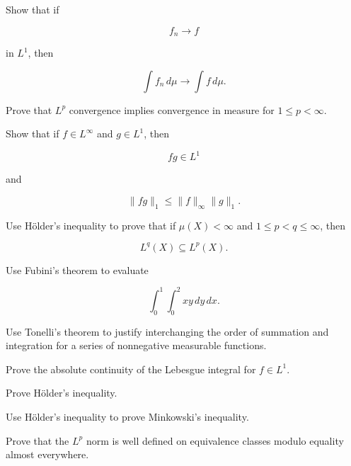 \begin{exercise}[3]
Show that if

\[
f_n\to f
\]

in \(L^1\), then

\[
\int f_n\,d\mu
\to
\int f\,d\mu.
\]
\end{exercise}

\begin{exercise}[3]
Prove that \(L^p\) convergence implies convergence in measure for
\(1\leq p<\infty\).
\end{exercise}

\begin{exercise}[3]
Show that if \(f\in L^\infty\) and \(g\in L^1\), then

\[
fg\in L^1
\]

and

\[
\boxed{
\|fg\|_1
\leq
\|f\|_\infty\|g\|_1.
}
\]
\end{exercise}

\begin{exercise}[3]
Use H\"older's inequality to prove that if \(\mu(X)<\infty\) and
\(1\leq p<q\leq\infty\), then

\[
L^q(X)\subseteq L^p(X).
\]
\end{exercise}

\begin{exercise}[3]
Use Fubini's theorem to evaluate

\[
\int_0^1\int_0^2xy\,dy\,dx.
\]
\end{exercise}

\begin{exercise}[3]
Use Tonelli's theorem to justify interchanging the order of summation and
integration for a series of nonnegative measurable functions.
\end{exercise}

\begin{exercise}[3]
Prove the absolute continuity of the Lebesgue integral for
\(f\in L^1\).
\end{exercise}

\begin{exercise}[4]
Prove H\"older's inequality.
\end{exercise}

\begin{exercise}[4]
Use H\"older's inequality to prove Minkowski's inequality.
\end{exercise}

\begin{exercise}[4]
Prove that the \(L^p\) norm is well defined on equivalence classes modulo
equality almost everywhere.
\end{exercise}

